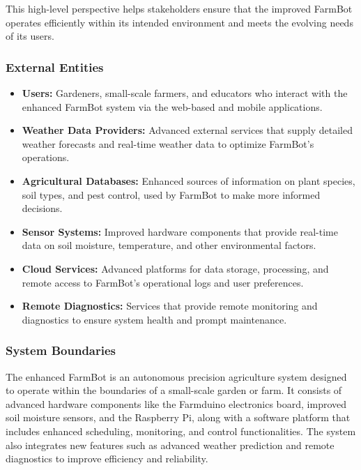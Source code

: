 This high-level perspective helps stakeholders ensure that the improved FarmBot operates efficiently within its intended environment and meets the evolving needs of its users.

\subsubsection{External Entities}
\begin{itemize}
    \item \textbf{Users:} Gardeners, small-scale farmers, and educators who interact with the enhanced FarmBot system via the web-based and mobile applications.
    \item \textbf{Weather Data Providers:} Advanced external services that supply detailed weather forecasts and real-time weather data to optimize FarmBot's operations.
    \item \textbf{Agricultural Databases:} Enhanced sources of information on plant species, soil types, and pest control, used by FarmBot to make more informed decisions.
    \item \textbf{Sensor Systems:} Improved hardware components that provide real-time data on soil moisture, temperature, and other environmental factors.
    \item \textbf{Cloud Services:} Advanced platforms for data storage, processing, and remote access to FarmBot's operational logs and user preferences.
    \item \textbf{Remote Diagnostics:} Services that provide remote monitoring and diagnostics to ensure system health and prompt maintenance.
\end{itemize}

\subsubsection{System Boundaries}
The enhanced FarmBot is an autonomous precision agriculture system designed to operate within the boundaries of a small-scale garden or farm. It consists of advanced hardware components like the Farmduino electronics board, improved soil moisture sensors, and the Raspberry Pi, along with a software platform that includes enhanced scheduling, monitoring, and control functionalities. The system also integrates new features such as advanced weather prediction and remote diagnostics to improve efficiency and reliability.


